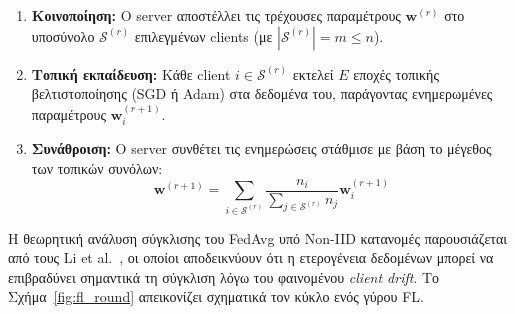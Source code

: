 \begin{enumerate}
    \item \textbf{Κοινοποίηση:} Ο server αποστέλλει τις τρέχουσες
    παραμέτρους $\mathbf{w}^{(r)}$ στο υποσύνολο $\mathcal{S}^{(r)}$
    επιλεγμένων clients (με $|\mathcal{S}^{(r)}| = m \leq n$).

    \item \textbf{Τοπική εκπαίδευση:} Κάθε client $i \in \mathcal{S}^{(r)}$
    εκτελεί $E$ εποχές τοπικής βελτιστοποίησης (SGD ή Adam) στα
    δεδομένα του, παράγοντας ενημερωμένες παραμέτρους
    $\mathbf{w}_i^{(r+1)}$.

    \item \textbf{Συνάθροιση:} Ο server συνθέτει τις ενημερώσεις
    στάθμισε με βάση το μέγεθος των τοπικών συνόλων:
    \begin{equation}
        \label{eq:fedavg}
        \mathbf{w}^{(r+1)} = \sum_{i \in \mathcal{S}^{(r)}}
        \frac{n_i}{\sum_{j \in \mathcal{S}^{(r)}} n_j}
        \mathbf{w}_i^{(r+1)}
    \end{equation}
\end{enumerate}

Η θεωρητική ανάλυση σύγκλισης του FedAvg υπό Non-IID κατανομές
παρουσιάζεται από τους Li et al.\ \cite{Li2020}, οι οποίοι αποδεικνύουν
ότι η ετερογένεια δεδομένων μπορεί να επιβραδύνει σημαντικά τη σύγκλιση
λόγω του φαινομένου \textit{client drift}. Το Σχήμα~\ref{fig:fl_round}
απεικονίζει σχηματικά τον κύκλο ενός γύρου FL.

